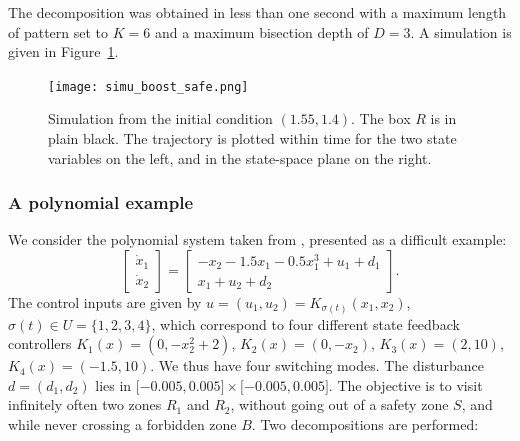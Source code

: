 The decomposition was obtained in less than one second with a maximum
length of pattern set to $K = 6$ and a maximum bisection depth of $D =
3$.  A simulation is given in Figure~\ref{fig:NL_0}.

\begin{figure}[t]
 \centering
 \texttt{[image: simu\_boost\_safe.png]}
 \caption{Simulation from the initial condition $(1.55,1.4)$. The box
   $R$ is in plain black. The trajectory is plotted within time for
   the two state variables on the left, and in the state-space plane
   on the right.}
  \label{fig:NL_0}
\end{figure}


\subsubsection{A polynomial example}
\label{ex2}
%
%
We consider the polynomial system taken from \cite{liu2013synthesis},
presented as a difficult example:
%
\begin{equation}
 \left \lbrack \begin{matrix}
  \dot x_1 \\ \dot x_2
 \end{matrix} \right \rbrack  =
 \left \lbrack \begin{matrix} -x_2 - 1.5 x_1 - 0.5 x_1^3 + u_1 + d_1 \\ x_1 + u_2 + d_2
   \end{matrix} \right \rbrack.
\end{equation}
%
The control inputs are given by $u = (u_1,u_2) =
K_{\sigma(t)}(x_1,x_2)$, $\sigma(t) \in U = \{ 1,2,3,4 \}$, which
correspond to four different state feedback controllers $K_1(x) =
(0,-x_2^2 + 2)$, $K_2(x) = (0,-x_2)$, $K_3(x) = (2,10)$, $K_4(x) =
(-1.5,10)$.  We thus have four switching modes. The disturbance $d =
(d_1,d_2)$ lies in $\lbrack -0.005,0.005 \rbrack \times \lbrack
-0.005,0.005 \rbrack$.  The objective is to visit infinitely often two
zones $R_1$ and $R_2$, without going out of a safety zone $S$, and
while never crossing a forbidden zone $B$.  Two decompositions are
performed:
